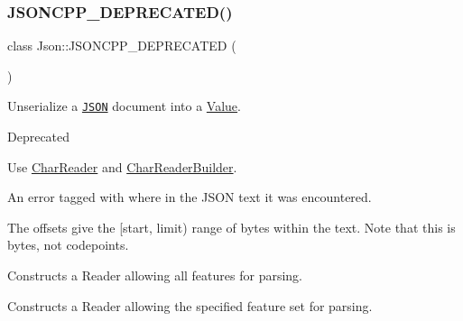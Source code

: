 \subsubsection{\texorpdfstring{J\+S\+O\+N\+C\+P\+P\+\_\+\+D\+E\+P\+R\+E\+C\+A\+T\+E\+D()}{JSONCPP\_DEPRECATED()}\hspace{0.1cm}{\footnotesize\ttfamily [1/3]}}
{\footnotesize\ttfamily class Json\+::\+J\+S\+O\+N\+C\+P\+P\+\_\+\+D\+E\+P\+R\+E\+C\+A\+T\+ED (\begin{DoxyParamCaption}\item[{\char`\"{}Use \hyperlink{classJson_1_1CharReader}{Char\+Reader} and \hyperlink{classJson_1_1CharReaderBuilder}{Char\+Reader\+Builder} instead\char`\"{}}]{ }\end{DoxyParamCaption})}



Unserialize a \href{http://www.json.org}{\tt J\+S\+ON} document into a \hyperlink{classJson_1_1Value}{Value}. 

\begin{DoxyRefDesc}{Deprecated}
\item[\hyperlink{deprecated__deprecated000005}{Deprecated}]Use \hyperlink{classJson_1_1CharReader}{Char\+Reader} and \hyperlink{classJson_1_1CharReaderBuilder}{Char\+Reader\+Builder}. \end{DoxyRefDesc}
An error tagged with where in the J\+S\+ON text it was encountered.

The offsets give the \mbox{[}start, limit) range of bytes within the text. Note that this is bytes, not codepoints.

Constructs a Reader allowing all features for parsing.

Constructs a Reader allowing the specified feature set for parsing.

